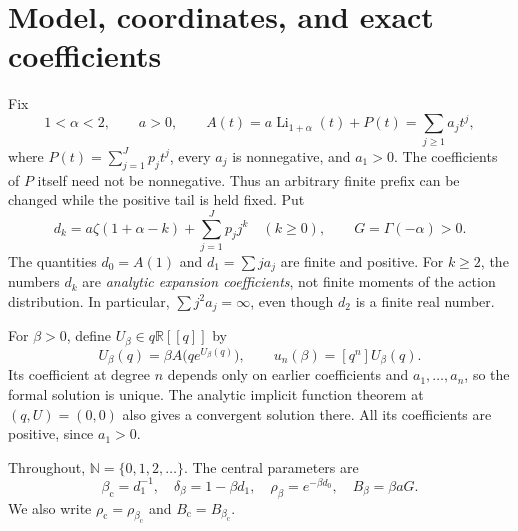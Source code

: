 \documentclass[11pt,a4paper]{article}
\numberwithin{equation}{section}
\theoremstyle{definition}
\theoremstyle{remark}
\DeclareMathOperator{\Li}{Li}
\newcommand{\N}{\mathbb N}
\newcommand{\R}{\mathbb R}
\newcommand{\bc}{\beta_{\mathrm c}}
\newcommand{\rhoc}{\rho_{\mathrm c}}
\newcommand{\Bc}{B_{\mathrm c}}
\begin{document}
\section{Model, coordinates, and exact coefficients}
\label{sec:model}

Fix
\begin{equation}\label{eq:model-assumptions}
 1<\alpha<2,\qquad a>0,\qquad
 A(t)=a\Li_{1+\alpha}(t)+P(t)=\sum_{j\ge1}a_jt^j,
\end{equation}
where $P(t)=\sum_{j=1}^Jp_jt^j$, every $a_j$ is nonnegative, and $a_1>0$.
The coefficients of $P$ itself need not be nonnegative. Thus an arbitrary
finite prefix can be changed while the positive tail is held fixed. Put
\begin{equation}\label{eq:d-def}
 d_k=a\zeta(1+\alpha-k)+\sum_{j=1}^Jp_jj^k\quad(k\ge0),
 \qquad G=\Gamma(-\alpha)>0.
\end{equation}
The quantities $d_0=A(1)$ and $d_1=\sum j a_j$ are finite and positive.
For $k\ge2$, the numbers $d_k$ are \emph{analytic expansion coefficients},
not finite moments of the action distribution. In particular,
$\sum j^2a_j=\infty$, even though $d_2$ is a finite real number.

For $\beta>0$, define $U_\beta\in q\R[[q]]$ by
\begin{equation}\label{eq:feedback}
 U_\beta(q)=\beta A\bigl(qe^{U_\beta(q)}\bigr),
 \qquad u_n(\beta)=[q^n]U_\beta(q).
\end{equation}
Its coefficient at degree $n$ depends only on earlier coefficients and
$a_1,\ldots,a_n$, so the formal solution is unique. The analytic implicit
function theorem at $(q,U)=(0,0)$ also gives a convergent solution there.
All its coefficients are positive, since $a_1>0$.

Throughout, $\N=\{0,1,2,\ldots\}$. The central parameters are
\begin{equation}\label{eq:parameters}
 \bc=d_1^{-1},\quad \delta_\beta=1-\beta d_1,\quad
 \rho_\beta=e^{-\beta d_0},\quad B_\beta=\beta aG.
\end{equation}
We also write $\rhoc=\rho_{\bc}$ and $\Bc=B_{\bc}$.
\end{document}
